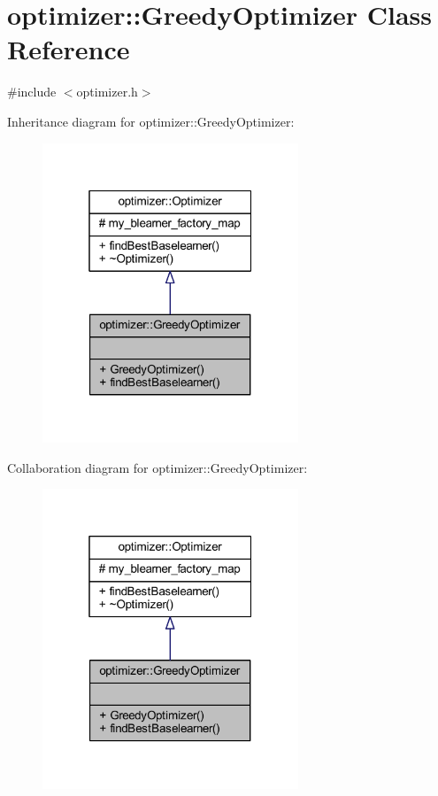 \hypertarget{classoptimizer_1_1_greedy_optimizer}{}\section{optimizer\+:\+:Greedy\+Optimizer Class Reference}
\label{classoptimizer_1_1_greedy_optimizer}


{\ttfamily \#include $<$optimizer.\+h$>$}



Inheritance diagram for optimizer\+:\+:Greedy\+Optimizer\+:\nopagebreak
\begin{figure}[H]
\begin{center}
\leavevmode
\includegraphics[width=217pt]{classoptimizer_1_1_greedy_optimizer__inherit__graph}
\end{center}
\end{figure}


Collaboration diagram for optimizer\+:\+:Greedy\+Optimizer\+:\nopagebreak
\begin{figure}[H]
\begin{center}
\leavevmode
\includegraphics[width=217pt]{classoptimizer_1_1_greedy_optimizer__coll__graph}
\end{center}
\end{figure}
